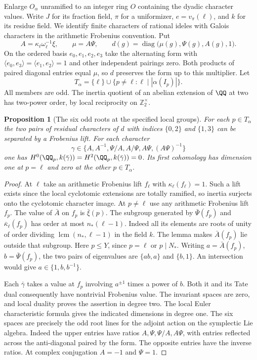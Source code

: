 \documentclass[a4paper,11pt]{article}
\newtheorem{proposition}{Proposition}[section]
\theoremstyle{definition}
\theoremstyle{remark}
\newcommand{\ZZ}{\mathbb Z}\newcommand{\ord}{\operatorname{ord}}
\numberwithin{equation}{section}
\begin{document}
Enlarge \(O_\alpha\) unramified to an integer ring \(O\)
containing the dyadic character values. Write \(J\) for its
fraction field, \(\pi\) for a uniformizer, \(e=v_\pi(\ell)\),
and \(k\) for its residue field. We identify finite characters
of rational ideles with Galois characters in the arithmetic
Frobenius convention. Put
\[
  A=\kappa_\ell\omega_\ell^{-1}\xi,\qquad
  \mu=A\Psi,\qquad d(g)=\operatorname{diag}
           \bigl(\mu(g),\Psi(g),A(g),1\bigr).
\]
On the ordered basis \(e_0,e_1,e_2,e_3\) take the alternating
form with \(\langle e_0,e_3\rangle=\langle e_1,e_2\rangle=1\)
and other independent pairings zero. Both products of paired
diagonal entries equal \(\mu\), so \(d\) preserves the form
up to this multiplier. Let
\[
   T_\alpha=\{\ell\}\cup\{p\ne\ell:\ell\mid|\alpha(I_p)|\}.
\]
All members are odd. The inertia quotient of an abelian
extension of \(\QQ\) at two has two-power order, by local
reciprocity on \(\ZZ_2^\times\).

\begin{proposition}[The six odd roots at the specified local groups]\leavevmode
\label{prop:localsymplecticroots429}
For each \(p\in T_\alpha\) the two pairs of residual
characters of \(d\) with indices \(\{0,2\}\) and \(\{1,3\}\)
can be separated by a Frobenius lift. For each character
\[
           \gamma\in\{A,A^{-1},\Psi/A,A/\Psi,
                                  A\Psi,(A\Psi)^{-1}\}
\]
one has \(H^0(\QQ_p,k(\bar\gamma))=
H^2(\QQ_p,k(\bar\gamma))=0\). Its first cohomology has
dimension one at \(p=\ell\) and zero at the other \(p\in T_\alpha\).
\end{proposition}
\begin{proof}
At \(\ell\) take an arithmetic Frobenius lift \(f_\ell\)
with \(\kappa_\ell(f_\ell)=1\). Such a lift exists since the
local cyclotomic extensions are totally ramified, so inertia
surjects onto the cyclotomic character image. At \(p\ne\ell\)
use any arithmetic Frobenius lift \(f_p\).
The value of \(\bar A\) on \(f_p\) is \(\bar\xi(p)\).
The subgroup generated by \(\bar\Psi(f_p)\) and
\(\bar\kappa_\ell(f_p)\) has order at most \(n_*(\ell-1)\).
Indeed all its elements are roots of unity of order dividing
\(\operatorname{lcm}(n_*,\ell-1)\) in the field \(k\).
The lemma makes \(\bar A(f_p)\) lie outside that subgroup.
Here \(p\le Y\), since \(p=\ell\) or \(p\mid N_*\).
Writing \(a=\bar A(f_p)\), \(b=\bar\Psi(f_p)\), the two
pairs of eigenvalues are \(\{ab,a\}\) and \(\{b,1\}\).
An intersection would give \(a\in\{1,b,b^{-1}\}\).

Each \(\bar\gamma\) takes a value at \(f_p\) involving
\(a^{\pm1}\) times a power of \(b\). Both it and its Tate
dual consequently have nontrivial Frobenius value. The
invariant spaces are zero, and local duality proves the
assertion in degree two. The local Euler characteristic
formula gives the indicated dimensions in degree one. The
six spaces are precisely the odd root lines for the
adjoint action on the symplectic Lie algebra. Indeed the
upper entries have ratios \(A,\Psi,\Psi/A,A\Psi\), with
entries reflected across the anti-diagonal paired by the
form. The opposite entries have the inverse ratios.
At complex conjugation \(A=-1\) and \(\Psi=1\).
\end{proof}
\end{document}
